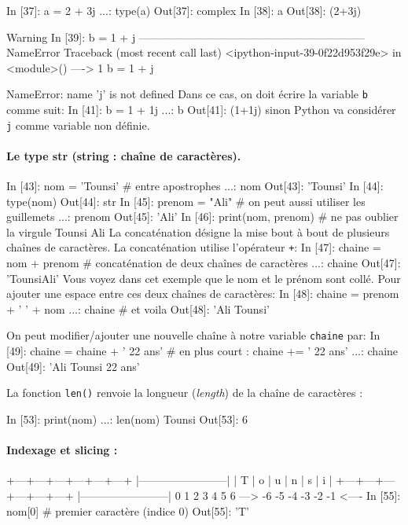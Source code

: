 \documentclass[%
oneside,                 %
final,                   %
10pt]{article}
\begin{document}
\bipy
In [37]: a = 2 + 3j
    ...: type(a)
Out[37]: complex
In [38]: a
Out[38]: (2+3j)
\eipy
\begin{block}{Warning}
\bipy
In [39]: b = 1 + j
--------------------------------------------------------------
NameError                      Traceback (most recent call last)
<ipython-input-39-0f22d953f29e> in <module>()
----> 1 b = 1 + j

NameError: name 'j' is not defined
\eipy
Dans ce cas, on doit écrire la variable \texttt{b} comme suit:
\bipy
In [41]: b = 1 + 1j
    ...: b
Out[41]: (1+1j)
\eipy
sinon Python va considérer \texttt{j} comme variable non définie.
\end{block}

\paragraph{Le type str (string : chaîne de caractères).}
\bipy

In [43]: nom = 'Tounsi' # entre apostrophes
    ...: nom
Out[43]: 'Tounsi'
In [44]: type(nom)
Out[44]: str
In [45]: prenom = "Ali"  # on peut aussi utiliser les guillemets
    ...: prenom
Out[45]: 'Ali'
In [46]: print(nom, prenom)  # ne pas oublier la virgule
Tounsi Ali
\eipy
La concaténation désigne la mise bout à bout de plusieurs chaînes de caractères.
La concaténation utilise l'opérateur \texttt{+}:
\bipy
In [47]: chaine = nom + prenom  # concaténation de deux chaînes de caractères
    ...: chaine
Out[47]: 'TounsiAli'
\eipy
Vous voyez dans cet exemple que le nom et le prénom sont collé. Pour ajouter une espace entre ces deux chaînes de caractères:
\bipy
In [48]: chaine = prenom + ' ' + nom
    ...: chaine # et voila
Out[48]: 'Ali Tounsi'
\eipy

On peut modifier/ajouter une nouvelle chaîne à notre variable \texttt{chaine} par:
\bipy
In [49]: chaine = chaine + ' 22 ans'  # en plus court : chaine += ' 22 ans'
    ...: chaine
Out[49]: 'Ali Tounsi 22 ans'
\eipy

La fonction \texttt{len()} renvoie la longueur (\emph{length}) de la chaîne de caractères :

\bipy
In [53]: print(nom)
    ...: len(nom)
Tounsi
Out[53]: 6
\eipy
\paragraph{Indexage et slicing :}

\bccq
 +---+---+---+---+---+---+
|------------------------|
 | T | o | u | n | s | i |
 +---+---+---+---+---+---+
 |------------------------|
 0   1   2   3   4   5   6
 --->
-6  -5  -4  -3  -2  -1
                   <----
\eccq
\bipy
In [55]: nom[0]  # premier caractère (indice 0)
Out[55]: 'T'
\end{document}
